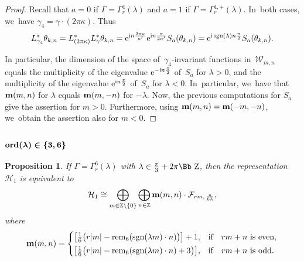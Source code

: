 \documentclass[pdftex]{sigma}
\newcommand\ZZ{{\mbox{\Bb Z}}}
\newcommand\Z{{\mathbb Z}}
\newcommand\bm{\textbf{{\rm \textbf{m}}}}
\newcommand\cH{{\mathcal H}}
\newcommand\cF{{\mathcal F}}
\newcommand{\sgn}{\mathop{{\rm sgn}}}
\newcommand{\rem}{\mathop{{\rm rem}}}
\newcommand{\ord}{{\rm ord}}
\numberwithin{equation}{section}
\newtheorem{Proposition}[Theorem]{Proposition}
 { \theoremstyle{definition}
\newtheorem{Definition}[Theorem]{Definition}
\newtheorem{Note}[Theorem]{Note}
\newtheorem{Example}[Theorem]{Example}
\newtheorem{Remark}[Theorem]{Remark} }
\begin{document}
\begin{proof}
Recall that $a=0$ if $\Gamma=\Gamma_r^4(\lambda)$ and $a=1$ if $\Gamma=\Gamma_r^{4,+}(\lambda)$. In~both cases, we~have $\gamma_4=\gamma\cdot(2\pi\kappa)$. Thus
\begin{gather*}
L^*_{\gamma_4} \theta_{k,n}=L^*_{(2\pi\kappa)} L^*_{\gamma}\theta_{k,n}={\rm e}^{{\rm i}n\frac{2\pi\kappa}{\kappa'}}{\rm e}^{{\rm i}n\frac{\pi}{2\kappa'}}S_a(\theta_{k,n})={\rm e}^{{\rm i}\sgn(\lambda)n\frac{\pi}{2}}S_a(\theta_{k,n}).
\end{gather*}

In particular, the dimension of the space of~$\gamma_4$-invariant functions in~${\mathcal W}_{m,n}$ equals the multiplicity of the eigenvalue ${\rm e}^{-{\rm i}n\frac{\pi}{2}}$ of~$S_a$ for $\lambda>0$, and the multiplicity of the eigenvalue ${\rm e}^{{\rm i}n\frac{\pi}{2}}$ of~$S_a$ for $\lambda<0$. In~particular, we~have that $\bm(m,n)$ for $\lambda$ equals $\bm(m,-n)$ for $-\lambda$. Now, the previous computations for $S_a$ give the assertion for $m>0$. Furthermore, using $\textbf{m}(m,n)=\bm(-m,-n)$, we~obtain the assertion also for $m<0$.
\end{proof}

\subsubsection[$\ord(\lambda)\in\{3,6\}$]{$\boldsymbol{\ord(\lambda)\in\{3,6\}}$}

\begin{Proposition} \label{P13} If $\Gamma=\Gamma^6_r(\lambda)$ with $\lambda\in\frac{\pi}3+2\pi\ZZ$, then the representation~$\cH_1$ is equivalent to
\begin{gather*}
\cH_1\cong\bigoplus_{m\in \Z\backslash\{0\}} \bigoplus_{n\in\Z} \bm(m,n)\cdot \cF_{rm,\,\frac n{6\lambda}},
\end{gather*}
where
\begin{gather*}
\bm(m,n) =\begin{cases}
\big[\frac16\big({r|m|-\rem_6(\sgn(\lambda m)\cdot n)}\big)\big]+1,& \text{if\quad $rm+n$ is even},
\\[.5ex]
\big[\frac16\big(r|m|-\rem_6(\sgn(\lambda m)\cdot n)+3\big)\big],& \text{if\quad $rm+n$ is odd}.
\end{cases}
\end{gather*}
\end{Proposition}
\end{document}
